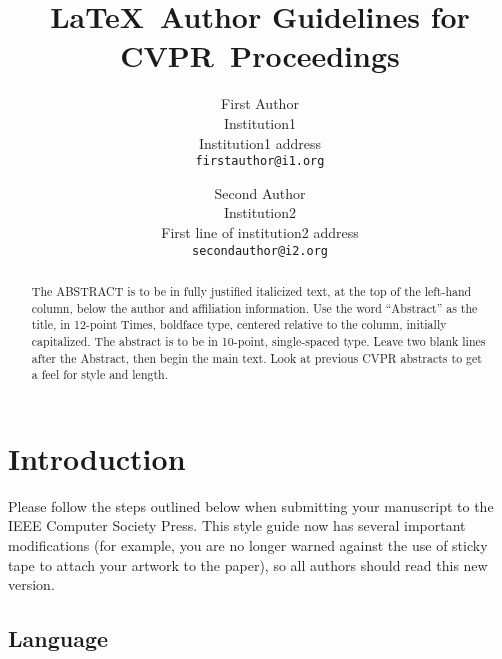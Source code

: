 \documentclass[10pt,twocolumn,letterpaper]{article}
\def\confName{CVPR}
\begin{document}
  \title{\LaTeX\ Author Guidelines for \confName~Proceedings}

  \author{First Author\\
  Institution1\\
  Institution1 address\\
  {\tt\small firstauthor@i1.org}
  \and
  Second Author\\
  Institution2\\
  First line of institution2 address\\
  {\tt\small secondauthor@i2.org}
  }
  \maketitle

  \begin{abstract}
    The ABSTRACT is to be in fully justified italicized text, at the top of the left-hand column, below the author and affiliation information.
    Use the word ``Abstract'' as the title, in 12-point Times, boldface type, centered relative to the column, initially capitalized.
    The abstract is to be in 10-point, single-spaced type.
    Leave two blank lines after the Abstract, then begin the main text.
    Look at previous CVPR abstracts to get a feel for style and length.
  \end{abstract}

  \section{Introduction}
  \label{sec:intro}

  Please follow the steps outlined below when submitting your manuscript to the IEEE Computer Society Press.
  This style guide now has several important modifications (for example, you are no longer warned against the use of sticky tape to attach your artwork to the paper), so all authors should read this new version.

  \subsection{Language}
\end{document}
